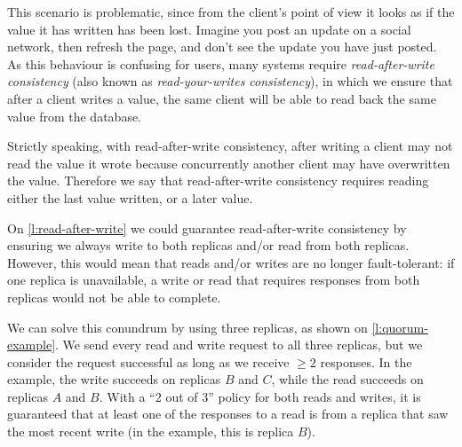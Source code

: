 This scenario is problematic, since from the client's point of view it looks as if the value it has written has been lost.
Imagine you post an update on a social network, then refresh the page, and don't see the update you have just posted.
As this behaviour is confusing for users, many systems require \emph{read-after-write consistency} (also known as \emph{read-your-writes consistency}), in which we ensure that after a client writes a value, the same client will be able to read back the same value from the database.

Strictly speaking, with read-after-write consistency, after writing a client may not read the value it wrote because concurrently another client may have overwritten the value.
Therefore we say that read-after-write consistency requires reading either the last value written, or a later value.

On \autoref{l:read-after-write} we could guarantee read-after-write consistency by ensuring we always write to both replicas and/or read from both replicas.
However, this would mean that reads and/or writes are no longer fault-tolerant: if one replica is unavailable, a write or read that requires responses from both replicas would not be able to complete.

We can solve this conundrum by using three replicas, as shown on \autoref{l:quorum-example}.
We send every read and write request to all three replicas, but we consider the request successful as long as we receive $\ge 2$ responses.
In the example, the write succeeds on replicas $B$ and $C$, while the read succeeds on replicas $A$ and $B$.
With a ``2 out of 3'' policy for both reads and writes, it is guaranteed that at least one of the responses to a read is from a replica that saw the most recent write (in the example, this is replica $B$).


